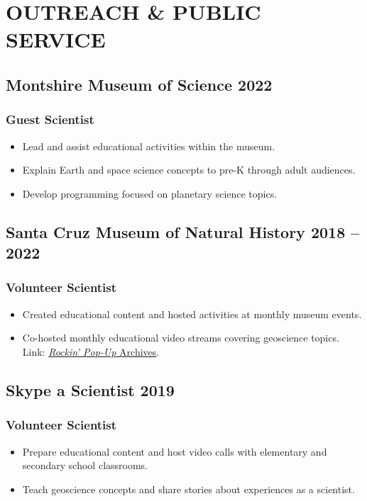 \section*{OUTREACH \& PUBLIC SERVICE}

\subsection*{\textbf{Montshire Museum of Science} \hfill 2022\ongoing}
\subsubsection*{Guest Scientist}
\begin{itemize}
\item Lead and assist educational activities within the museum.
\item Explain Earth and space science concepts to pre-K through adult audiences.
\item Develop programming focused on planetary science topics.
\end{itemize}

\subsection*{\textbf{Santa Cruz Museum of Natural History} \hfill 2018 – 2022}
\subsubsection*{Volunteer Scientist}
\begin{itemize}
	\item Created educational content and hosted activities at monthly museum events.
	\item Co-hosted monthly educational video streams covering geoscience topics. \\
	Link: \href{https://www.santacruzmuseum.org/category/rockin-pop-up/}{\emph{Rockin' Pop-Up} Archives}.
\end{itemize}

\subsection*{\textbf{Skype a Scientist} \hfill 2019\ongoing}
\subsubsection*{Volunteer Scientist}
\begin{itemize}
	\item Prepare educational content and host video calls with elementary and secondary school classrooms.
	\item Teach geoscience concepts and share stories about experiences as a scientist.
\end{itemize}

